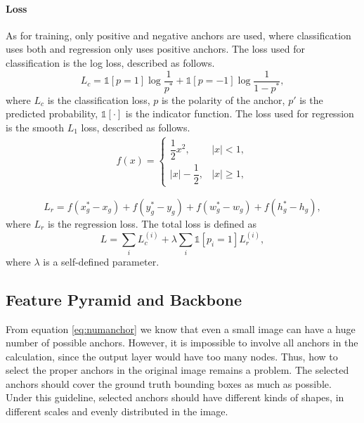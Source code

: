 \paragraph{Loss}
As for training, only positive and negative anchors are used, where classification uses both and regression only uses positive anchors. The loss used for classification is the log loss, described as follows.
\begin{equation}
	L_c = \mathbb{1}[p = 1]\log{\frac{1}{p^*}} + \mathbb{1}[p = -1]\log{\frac{1}{1-p^*}},
\end{equation}
where $L_c$ is the classification loss, $p$ is the polarity of the anchor, $p'$ is the predicted probability, $\mathbb{1}[\cdot]$ is the indicator function. The loss used for regression is the smooth $L_1$ loss, described as follows.
\begin{equation}
\begin{aligned}
	f(x) = \begin{cases}
		\dfrac{1}{2}x^2, & \lvert x \rvert < 1, \\
		\lvert x \rvert - \dfrac{1}{2}, & \lvert x \rvert \geqslant 1,
	\end{cases}
\end{aligned}
\end{equation}

\begin{equation}
	L_r = f(x_g^* - x_g) + f(y_g^* - y_g) + f(w_g^* - w_g) + f(h_g^* - h_g),
\end{equation}
where $L_r$ is the regression loss. The total loss is defined as
\begin{equation}
	L = \sum_{i}^{} L_c^{(i)} + \lambda\sum_{i}^{}\mathbb{1}[p_i = 1]L_r^{(i)},
\end{equation}
where $\lambda$ is a self-defined parameter.

\subsection{Feature Pyramid and Backbone}\label{fpnbone}

From equation \ref{eq:numanchor} we know that even a small image can have a huge number of possible anchors. However, it is impossible to involve all anchors in the calculation, since the output layer would have too many nodes. Thus, how to select the proper anchors in the original image remains a problem. The selected anchors should cover the ground truth bounding boxes as much as possible. Under this guideline, selected anchors should have different kinds of shapes, in different scales and evenly distributed in the image.


